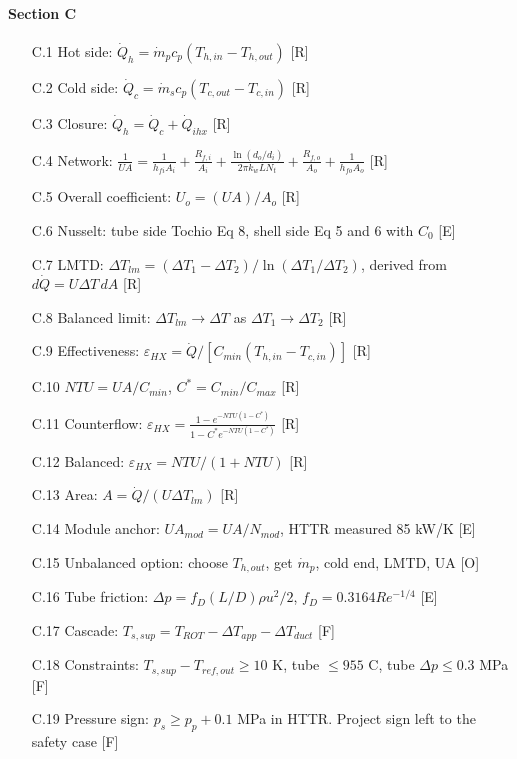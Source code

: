 \paragraph{Section C}
\begin{enumerate}[leftmargin=1.4cm,itemsep=0pt,topsep=2pt,parsep=0pt]\small
\item[C.1] Hot side: $\dot Q_h=\dot m_pc_p(T_{h,in}-T_{h,out})$ {\footnotesize [R]}
\item[C.2] Cold side: $\dot Q_c=\dot m_sc_p(T_{c,out}-T_{c,in})$ {\footnotesize [R]}
\item[C.3] Closure: $\dot Q_h=\dot Q_c+\dot Q_{ihx}$ {\footnotesize [R]}
\item[C.4] Network: $\frac1{UA}=\frac1{h_{fi}A_i}+\frac{R_{f,i}}{A_i}+\frac{\ln(d_o/d_i)}{2\pi k_wLN_t}+\frac{R_{f,o}}{A_o}+\frac1{h_{fo}A_o}$ {\footnotesize [R]}
\item[C.5] Overall coefficient: $U_o=(UA)/A_o$ {\footnotesize [R]}
\item[C.6] Nusselt: tube side Tochio Eq 8, shell side Eq 5 and 6 with $C_0$ {\footnotesize [E]}
\item[C.7] LMTD: $\Delta T_{lm}=(\Delta T_1-\Delta T_2)/\ln(\Delta T_1/\Delta T_2)$, derived from $d\dot Q=U\Delta T\,dA$ {\footnotesize [R]}
\item[C.8] Balanced limit: $\Delta T_{lm}\to\Delta T$ as $\Delta T_1\to\Delta T_2$ {\footnotesize [R]}
\item[C.9] Effectiveness: $\varepsilon_{HX}=\dot Q/[C_{min}(T_{h,in}-T_{c,in})]$ {\footnotesize [R]}
\item[C.10] $NTU=UA/C_{min}$, $C^*=C_{min}/C_{max}$ {\footnotesize [R]}
\item[C.11] Counterflow: $\varepsilon_{HX}=\frac{1-e^{-NTU(1-C^*)}}{1-C^*e^{-NTU(1-C^*)}}$ {\footnotesize [R]}
\item[C.12] Balanced: $\varepsilon_{HX}=NTU/(1+NTU)$ {\footnotesize [R]}
\item[C.13] Area: $A=\dot Q/(U\Delta T_{lm})$ {\footnotesize [R]}
\item[C.14] Module anchor: $UA_{mod}=UA/N_{mod}$, HTTR measured 85 kW/K {\footnotesize [E]}
\item[C.15] Unbalanced option: choose $T_{h,out}$, get $\dot m_p$, cold end, LMTD, UA {\footnotesize [O]}
\item[C.16] Tube friction: $\Delta p=f_D(L/D)\rho u^2/2$, $f_D=0.3164Re^{-1/4}$ {\footnotesize [E]}
\item[C.17] Cascade: $T_{s,sup}=T_{ROT}-\Delta T_{app}-\Delta T_{duct}$ {\footnotesize [F]}
\item[C.18] Constraints: $T_{s,sup}-T_{ref,out}\ge10$ K, tube $\le955$ C, tube $\Delta p\le0.3$ MPa {\footnotesize [F]}
\item[C.19] Pressure sign: $p_s\ge p_p+0.1$ MPa in HTTR. Project sign left to the safety case {\footnotesize [F]}
\end{enumerate}

